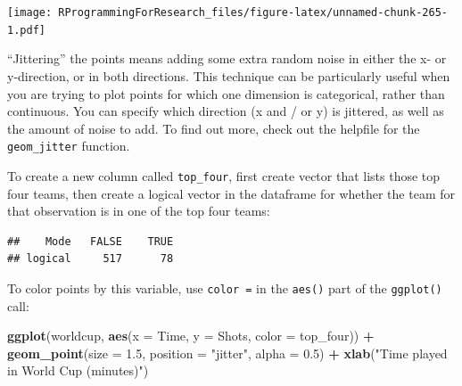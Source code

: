 \documentclass[]{book}
\makeatletter
\newenvironment{Shaded}{\begin{snugshade}}{\end{snugshade}}
\newcommand{\KeywordTok}[1]{\textcolor[rgb]{0.13,0.29,0.53}{\textbf{#1}}}
\newcommand{\DataTypeTok}[1]{\textcolor[rgb]{0.13,0.29,0.53}{#1}}
\newcommand{\FloatTok}[1]{\textcolor[rgb]{0.00,0.00,0.81}{#1}}
\newcommand{\StringTok}[1]{\textcolor[rgb]{0.31,0.60,0.02}{#1}}
\newcommand{\OperatorTok}[1]{\textcolor[rgb]{0.81,0.36,0.00}{\textbf{#1}}}
\newcommand{\NormalTok}[1]{#1}
\newenvironment{kframe}{%
\medskip{}
\setlength{\fboxsep}{.8em}
 \def\at@end@of@kframe{}%
 \ifinner\ifhmode%
  \def\at@end@of@kframe{\end{minipage}}%
  \begin{minipage}{\columnwidth}%
 \fi\fi%
 \def\FrameCommand##1{\hskip\@totalleftmargin \hskip-\fboxsep
 \colorbox{shadecolor}{##1}\hskip-\fboxsep
     \hskip-\linewidth \hskip-\@totalleftmargin \hskip\columnwidth}%
 \MakeFramed {\advance\hsize-\width
   \@totalleftmargin\z@ \linewidth\hsize
   \@setminipage}}%
 {\par\unskip\endMakeFramed%
 \at@end@of@kframe}
\renewenvironment{Shaded}{\begin{kframe}}{\end{kframe}}
\newenvironment{rmdblock}[1]
  {
  \begin{itemize}
  \renewcommand{\labelitemi}{
    \raisebox{-.7\height}[0pt][0pt]{
      {\setkeys{Gin}{width=3em,keepaspectratio}\texttt{[image: images/\#1]}}
    }
  }
  \setlength{\fboxsep}{1em}
  \begin{kframe}
  \item
  }
  {
  \end{kframe}
  \end{itemize}
  }
\newenvironment{rmdnote}
  {\begin{rmdblock}{note}}
  {\end{rmdblock}}
\theoremstyle{definition}
\theoremstyle{definition}
\theoremstyle{definition}
\theoremstyle{remark}
\makeatother
\begin{document}
\texttt{[image: RProgrammingForResearch\_files/figure-latex/unnamed-chunk-265-1.pdf]}

\begin{rmdnote}
``Jittering'' the points means adding some extra random noise in either
the x- or y-direction, or in both directions. This technique can be
particularly useful when you are trying to plot points for which one
dimension is categorical, rather than continuous. You can specify which
direction (x and / or y) is jittered, as well as the amount of noise to
add. To find out more, check out the helpfile for the
\texttt{geom\_jitter} function.
\end{rmdnote}

To create a new column called \texttt{top\_four}, first create vector
that lists those top four teams, then create a logical vector in the
dataframe for whether the team for that observation is in one of the top
four teams:

\begin{Shaded}
\end{Shaded}

\begin{verbatim}
##    Mode   FALSE    TRUE 
## logical     517      78
\end{verbatim}

To color points by this variable, use \texttt{color\ =} in the
\texttt{aes()} part of the \texttt{ggplot()} call:

\begin{Shaded}
\begin{Highlighting}[]
\KeywordTok{ggplot}\NormalTok{(worldcup, }\KeywordTok{aes}\NormalTok{(}\DataTypeTok{x =}\NormalTok{ Time, }\DataTypeTok{y =}\NormalTok{ Shots,}
                     \DataTypeTok{color =}\NormalTok{ top_four)) }\OperatorTok{+}
\StringTok{        }\KeywordTok{geom_point}\NormalTok{(}\DataTypeTok{size =} \FloatTok{1.5}\NormalTok{, }\DataTypeTok{position =} \StringTok{"jitter"}\NormalTok{,}
                   \DataTypeTok{alpha =} \FloatTok{0.5}\NormalTok{)  }\OperatorTok{+}\StringTok{ }
\StringTok{        }\KeywordTok{xlab}\NormalTok{(}\StringTok{"Time played in World Cup (minutes)"}\NormalTok{)}
\end{Highlighting}
\end{Shaded}
\end{document}
